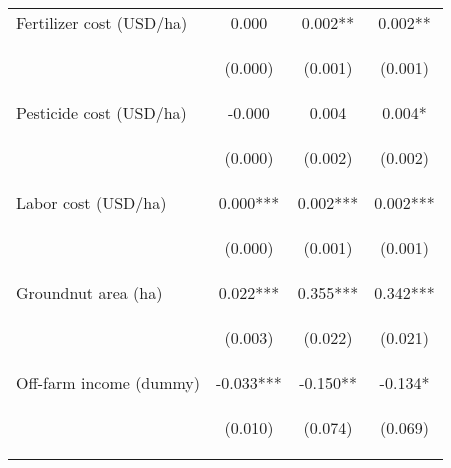 \begin{center}
\begin{tabular}{lccc}
Fertilizer cost (USD/ha) & 0.000 & 0.002** & 0.002** \\
\vspace{4pt} & \begin{footnotesize}(0.000)\end{footnotesize} & \begin{footnotesize}(0.001)\end{footnotesize} & \begin{footnotesize}(0.001)\end{footnotesize} \\
Pesticide cost (USD/ha) & -0.000 & 0.004 & 0.004* \\
\vspace{4pt} & \begin{footnotesize}(0.000)\end{footnotesize} & \begin{footnotesize}(0.002)\end{footnotesize} & \begin{footnotesize}(0.002)\end{footnotesize} \\
Labor cost (USD/ha) & 0.000*** & 0.002*** & 0.002*** \\
\vspace{4pt} & \begin{footnotesize}(0.000)\end{footnotesize} & \begin{footnotesize}(0.001)\end{footnotesize} & \begin{footnotesize}(0.001)\end{footnotesize} \\
Groundnut area (ha) & 0.022*** & 0.355*** & 0.342*** \\
\vspace{4pt} & \begin{footnotesize}(0.003)\end{footnotesize} & \begin{footnotesize}(0.022)\end{footnotesize} & \begin{footnotesize}(0.021)\end{footnotesize} \\
Off-farm income (dummy) & -0.033*** & -0.150** & -0.134* \\
\vspace{4pt} & \begin{footnotesize}(0.010)\end{footnotesize} & \begin{footnotesize}(0.074)\end{footnotesize} & \begin{footnotesize}(0.069)\end{footnotesize} \\

\end{tabular}
\end{center}
